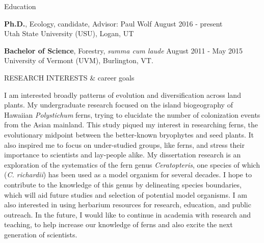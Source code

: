\documentclass{resume} %
\begin{document}

\begin{rSection}{Education}

\textbf{Ph.D.}, Ecology, candidate, Advisor: Paul Wolf \hfill August 2016 - present
\\
Utah State University (USU), Logan, UT 

\textbf{Bachelor of Science}, Forestry, \textit{summa cum laude} \hfill August 2011 - May 2015
\\ 
University of Vermont (UVM), Burlington, VT.
\end{rSection}


\begin{rSection}{RESEARCH INTERESTS \& career goals}  

I am interested broadly patterns of evolution and diversification across land plants. My undergraduate research focused on the island biogeography of Hawaiian \textit{Polystichum} ferns, trying to elucidate the number of colonization events from the Asian mainland. This study piqued my interest in researching ferns, the evolutionary midpoint between the better-known bryophytes and seed plants. It also inspired me to focus on under-studied groups, like ferns, and stress their importance to scientists and lay-people alike. My dissertation research is an exploration of the systematics of the fern genus \textit{Ceratopteris}, one species of which (\textit{C. richardii}) has been used as a model organism for several decades. I hope to contribute to the knowledge of this genus by delineating species boundaries, which will aid future studies and selection of potential model organisms. I am also interested in using herbarium resources for research, education, and public outreach. In the future, I would like to continue in academia with research and teaching, to help increase our knowledge of ferns and also excite the next generation of scientists.
\end{rSection}
\end{document}
